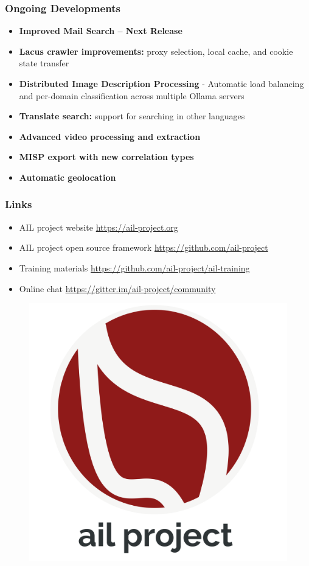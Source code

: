 \documentclass[10pt,aspectratio=169, colorlinks=true, linkcolor=circlBlue]{beamer}
\begin{document}
\begin{frame}
    \frametitle{Ongoing Developments}
    \begin{itemize}
        \item \textbf{Improved Mail Search – Next Release}
        \item \textbf{Lacus crawler improvements:} proxy selection, local cache, and cookie state transfer
        \item \textbf{Distributed Image Description Processing} - Automatic load balancing and per-domain classification across multiple Ollama servers
        \item \textbf{Translate search:} support for searching in other languages
        \item \textbf{Advanced video processing and extraction}
        \item \textbf{MISP export with new correlation types}
        \item \textbf{Automatic geolocation}
    \end{itemize}
\end{frame}

\begin{frame}
\frametitle{Links}
    \begin{itemize}
        \item AIL project website \url{https://ail-project.org}
        \item AIL project open source framework \url{https://github.com/ail-project}
        \item Training materials \url{https://github.com/ail-project/ail-training}
        \item Online chat \url{https://gitter.im/ail-project/community}
    \end{itemize}
    \begin{figure}
        \includegraphics[scale=0.1, angle=0]{images/ail-project.png}
    \end{figure}
\end{frame}
\end{document}
